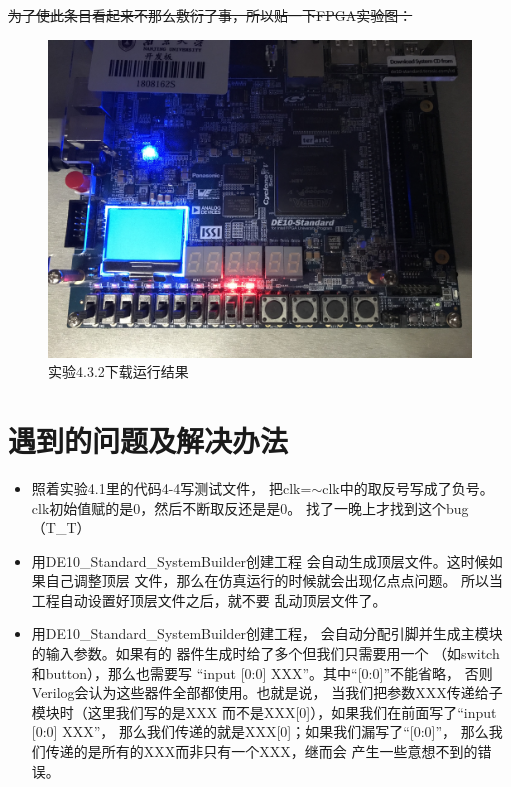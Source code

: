 \documentclass[12pt,a4paper,UTF8]{article}
\begin{document}
\sout{为了使此条目看起来不那么敷衍了事，所以贴一下FPGA实验图：}
\begin{figure}[H]
  \centering
  \includegraphics[width=1\textwidth]{FPGA_top.JPG}
  \caption{实验4.3.2下载运行结果}
  \label{FPGA_top}
\end{figure}

\section{遇到的问题及解决办法}
\begin{itemize}
  \item 照着实验4.1里的代码4-4写测试文件，
        把clk=$\sim$clk中的取反号写成了负号。
        clk初始值赋的是0，然后不断取反还是是0。
        找了一晚上才找到这个bug（T\_T）
  \item 用DE10\_Standard\_SystemBuilder创建工程
        会自动生成顶层文件。这时候如果自己调整顶层
        文件，那么在仿真运行的时候就会出现亿点点问题。
        所以当工程自动设置好顶层文件之后，就不要
        乱动顶层文件了。
  \item 用DE10\_Standard\_SystemBuilder创建工程，
        会自动分配引脚并生成主模块的输入参数。如果有的
        器件生成时给了多个但我们只需要用一个
        （如switch和button），那么也需要写
        ``input [0:0] XXX''。其中``[0:0]''不能省略，
        否则Verilog会认为这些器件全部都使用。也就是说，
        当我们把参数XXX传递给子模块时（这里我们写的是XXX
        而不是XXX[0]），如果我们在前面写了``input [0:0] XXX''，
        那么我们传递的就是XXX[0]；如果我们漏写了``[0:0]''，
        那么我们传递的是所有的XXX而非只有一个XXX，继而会
        产生一些意想不到的错误。
\end{itemize}
\end{document}

